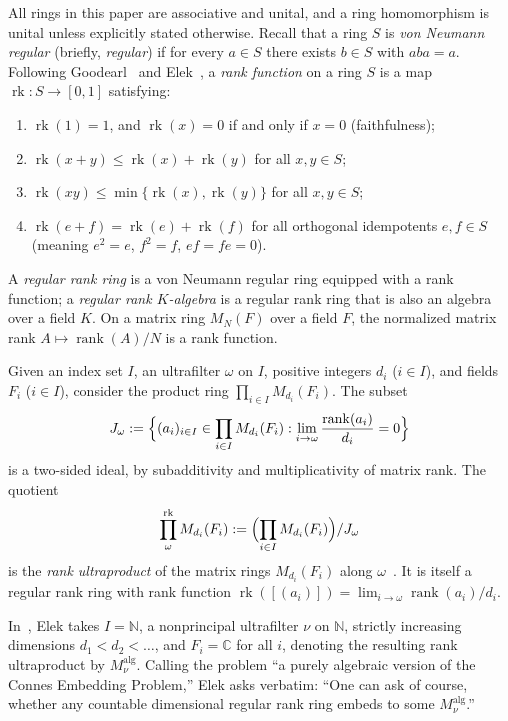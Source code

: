 \documentclass[11pt]{article}
\theoremstyle{definition}
\theoremstyle{remark}
\numberwithin{equation}{section}
\DeclareMathOperator{\rk}{rk}
\DeclareMathOperator{\rank}{rank}
\newcommand{\RUF}[3]{\prod_{#1}^{\mathrm{rk}} M_{#2}(#3)}
\newcommand{\C}{\mathbb{C}}
\newcommand{\N}{\mathbb{N}}
\newcommand{\1}{\mathbf{1}}
\begin{document}
All rings in this paper are associative and unital, and a ring homomorphism is unital unless explicitly stated otherwise. Recall that a ring $S$ is \emph{von Neumann regular} (briefly, \emph{regular}) if for every $a \in S$ there exists $b \in S$ with $aba = a$. Following Goodearl~\cite[Chapter~16]{Goodearl} and Elek~\cite{Elek2013}, a \emph{rank function} on a ring $S$ is a map $\rk\colon S \to [0,1]$ satisfying:
\begin{enumerate}[label=(R\arabic*),leftmargin=2.8em]
\item $\rk(1) = 1$, and $\rk(x) = 0$ if and only if $x = 0$ (faithfulness);
\item $\rk(x + y) \le \rk(x) + \rk(y)$ for all $x, y \in S$;
\item $\rk(xy) \le \min\{\rk(x), \rk(y)\}$ for all $x, y \in S$;
\item $\rk(e + f) = \rk(e) + \rk(f)$ for all orthogonal idempotents $e, f \in S$ (meaning $e^2 = e$, $f^2 = f$, $ef = fe = 0$).
\end{enumerate}
A \emph{regular rank ring} is a von Neumann regular ring equipped with a rank function; a \emph{regular rank $K$-algebra} is a regular rank ring that is also an algebra over a field $K$. On a matrix ring $M_N(F)$ over a field $F$, the normalized matrix rank $A \mapsto \rank(A)/N$ is a rank function.

Given an index set $I$, an ultrafilter $\omega$ on $I$, positive integers $d_i$ ($i \in I$), and fields $F_i$ ($i \in I$), consider the product ring $\prod_{i \in I} M_{d_i}(F_i)$. The subset
\[
J_\omega := \Bigl\{(a_i)_{i \in I} \in \prod_{i \in I} M_{d_i}(F_i) : \lim_{i \to \omega} \frac{\rank(a_i)}{d_i} = 0\Bigr\}
\]
is a two-sided ideal, by subadditivity and multiplicativity of matrix rank. The quotient
\[
\RUF{\omega}{d_i}{F_i} := \Bigl(\prod_{i \in I} M_{d_i}(F_i)\Bigr) / J_\omega
\]
is the \emph{rank ultraproduct} of the matrix rings $M_{d_i}(F_i)$ along $\omega$~\cite{ElekSzabo,Elek2013}. It is itself a regular rank ring with rank function $\rk([(a_i)]) = \lim_{i \to \omega} \rank(a_i)/d_i$.

In~\cite[Section~1.2]{Elek2013}, Elek takes $I = \N$, a nonprincipal ultrafilter $\nu$ on $\N$, strictly increasing dimensions $d_1 < d_2 < \dots$, and $F_i = \C$ for all $i$, denoting the resulting rank ultraproduct by $M^{\mathrm{alg}}_\nu$. Calling the problem ``a purely algebraic version of the Connes Embedding Problem,'' Elek asks verbatim: ``One can ask of course, whether any countable dimensional regular rank ring embeds to some $M^{\mathrm{alg}}_\nu$.''
\end{document}
